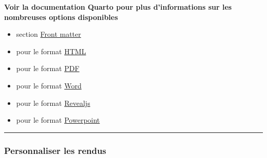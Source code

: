 \documentclass[
  french,
  10pt,
  a4paper,
]{article}
\providecommand{\tightlist}{%
  \setlength{\itemsep}{0pt}\setlength{\parskip}{0pt}}
\begin{document}
\begin{tcolorbox}[enhanced jigsaw, arc=.35mm, bottomrule=.15mm, breakable, colback=white, colframe=quarto-callout-note-color-frame, left=2mm, leftrule=.75mm, opacityback=0, rightrule=.15mm, toprule=.15mm]
\begin{minipage}[t]{5.5mm}
\textcolor{quarto-callout-note-color}{\faInfo}
\end{minipage}%
\begin{minipage}[t]{\textwidth - 5.5mm}

\vspace{-3mm}\textbf{Voir la documentation Quarto pour plus d'informations sur les nombreuses
options disponibles}\vspace{3mm}

\begin{itemize}
\tightlist
\item
  section
  \href{https://quarto.org/docs/authoring/front-matter.html}{Front
  matter}\\
\item
  pour le format
  \href{https://quarto.org/docs/reference/formats/html.html}{HTML}\\
\item
  pour le format
  \href{https://quarto.org/docs/reference/formats/pdf.html}{PDF}\\
\item
  pour le format
  \href{https://quarto.org/docs/reference/formats/docx.html}{Word}\\
\item
  pour le format
  \href{https://quarto.org/docs/reference/formats/presentations/revealjs.html}{Revealjs}\\
\item
  pour le format
  \href{https://quarto.org/docs/reference/formats/presentations/pptx.html}{Powerpoint}\\
\end{itemize}

\end{minipage}%
\end{tcolorbox}

\begin{center}\rule{0.5\linewidth}{0.5pt}\end{center}

\subsubsection{Personnaliser les rendus}\label{personnaliser-les-rendus}
\end{document}
